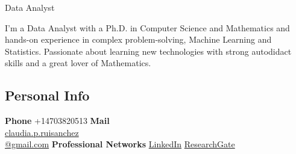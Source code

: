 \documentclass[]{friggeri-cv}
\begin{document}
      {Data Analyst}
      
I'm a Data Analyst  with  a Ph.D. in Computer Science and Mathematics and  hands-on experience in complex problem-solving, Machine Learning and Statistics. Passionate about learning new technologies with strong autodidact skills  and a great lover of Mathematics. 


\begin{aside}
  \section{Personal Info}
  \textbf{Phone} +14703820513
  \textbf{Mail} \\\href{mailto:claudia.p.ruisanchez@gmail.com}{claudia.p.ruisanchez\\@gmail.com}
   \textbf{Professional Networks}
    \href{https://www.linkedin.com/in/claudiaperezruisanchez/}{LinkedIn}
    \href{https://https://www.researchgate.net/profile/Claudia_Perez59}{ResearchGate}     

\end{aside}
\end{document}
